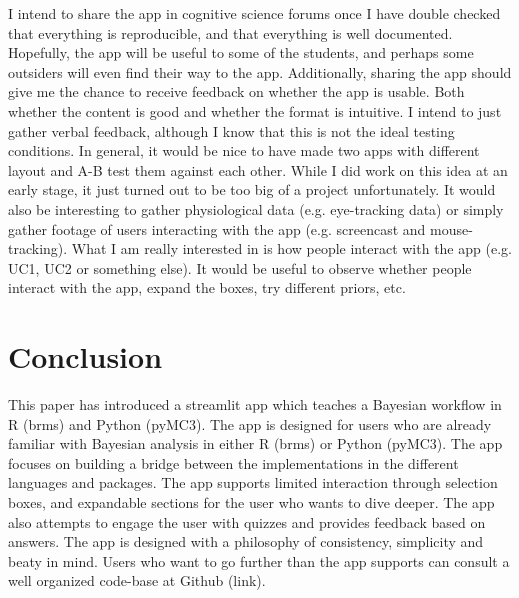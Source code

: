 \documentclass[12pt]{article}
\begin{document}
I intend to share the app in cognitive science forums once I have double checked
that everything is reproducible, and that everything is well documented. Hopefully,
the app will be useful to some of the students, and perhaps some outsiders will even
find their way to the app. Additionally, sharing the app should give me the chance
to receive feedback on whether the app is usable. Both whether the content is good
and whether the format is intuitive. I intend to just gather verbal feedback,
although I know that this is not the ideal testing conditions.
In general, it would be nice to have made two apps with different layout and
A-B test them against each other. While I did work on this idea at an early stage,
it just turned out to be too big of a project unfortunately.
It would also be interesting to gather physiological data (e.g. eye-tracking data)
or simply gather footage of users interacting with the app (e.g. screencast and mouse-tracking).
What I am really interested in is how people interact with the app
(e.g. UC1, UC2 or something else). It would be useful to observe whether people interact
with the app, expand the boxes, try different priors, etc.

\section{Conclusion}
This paper has introduced a streamlit app which teaches a Bayesian workflow in R (brms)
and Python (pyMC3). The app is designed for users who are already familiar with Bayesian
analysis in either R (brms) or Python (pyMC3). The app focuses on building a bridge
between the implementations in the different languages and packages.
The app supports limited interaction through selection boxes, and expandable
sections for the user who wants to dive deeper. The app also attempts to engage
the user with quizzes and provides feedback based on answers. The app is designed with
a philosophy of consistency, simplicity and beaty in mind. Users who want to
go further than the app supports can consult a well organized code-base at Github (link).

\printbibliography
\end{document}
